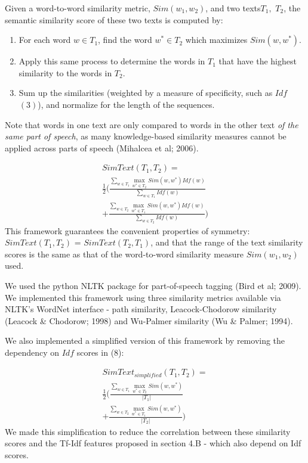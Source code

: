 \documentclass[letterpaper, 10 pt, conference]{ieeeconf}  %
\DeclareMathOperator*{\maxU}{max}
\begin{document}
Given a word-to-word similarity metric, $Sim(w_1, w_2)$, and two texts\footnotemark[3] $T_1,$ $T_2$, the semantic similarity score of these two texts is computed by:
\begin{enumerate}
\item For each word $w \in T_1$, find the word $w^* \in T_2$ which maximizes $Sim(w, w^*)$.
\item Apply this same process to determine the words in $T_1$ that have the highest similarity to the words in $T_2$. 
\item Sum up the similarities (weighted by a measure of specificity, such as $Idf$ $(3)$), and normalize for the length of the sequences. 
\end{enumerate}
Note that words in one text are only compared to words in the other text \emph{of the same part of speech}, as many knowledge-based similarity measures cannot be applied across parts of speech (Mihalcea et al; 2006).

\begin{gather*} \tag{8}
SimText(T_1,T_2) = \\ \frac{1}{2}\Big( \frac{\sum_{w \in T_1}{\maxU_{w^* \in T_2}Sim(w,w^*)Idf(w)}}{\sum_{w \in T_1}Idf(w)} \\ + \frac{\sum_{w \in T_2}{\maxU_{w^* \in T_1}Sim(w,w^*)Idf(w)}}{\sum_{w \in T_2}Idf(w)} \Big)
\end{gather*}
This framework guarantees the convenient properties of symmetry: $SimText(T_1, T_2)$ = $SimText(T_2, T_1)$, and that the range of the text similarity scores is the same as that of the word-to-word similarity measure  $Sim(w_1, w_2)$ used. 

We used the python NLTK package for part-of-speech tagging (Bird et al; 2009). We implemented this framework using three similarity metrics available via NLTK’s WordNet interface - path similarity, Leacock-Chodorow similarity (Leacock \& Chodorow; 1998) and Wu-Palmer similarity (Wu \& Palmer; 1994). 

We also implemented a simplified version of this framework by removing the dependency on $Idf$ scores in (8):

\begin{gather*} \tag{9}
SimText_{simplified}(T_1,T_2) = \\ \frac{1}{2}\Big( \frac{\sum_{w \in T_1}{\maxU_{w^* \in T_2}Sim(w,w^*)}}{|T_1|} \\ + \frac{\sum_{w \in T_2}{\maxU_{w^* \in T_1}Sim(w,w^*)}}{|T_2|} \Big)
\end{gather*}
We made this simplification to reduce the correlation between these similarity scores and the Tf-Idf features proposed in section 4.B - which also depend on Idf scores.
\end{document}
